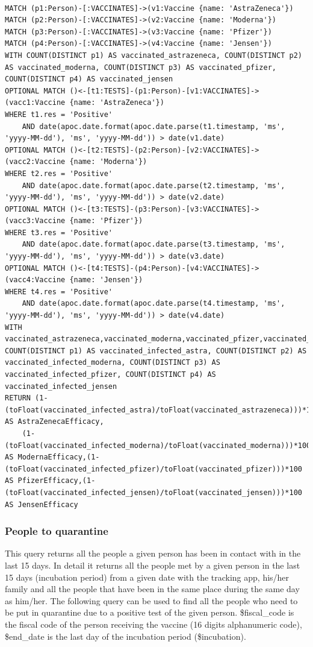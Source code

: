 \documentclass{article}
\begin{document}
\begin{lstlisting}[language=cypher, label=lst:cypher-example]

MATCH (p1:Person)-[:VACCINATES]->(v1:Vaccine {name: 'AstraZeneca'})
MATCH (p2:Person)-[:VACCINATES]->(v2:Vaccine {name: 'Moderna'})
MATCH (p3:Person)-[:VACCINATES]->(v3:Vaccine {name: 'Pfizer'})
MATCH (p4:Person)-[:VACCINATES]->(v4:Vaccine {name: 'Jensen'})
WITH COUNT(DISTINCT p1) AS vaccinated_astrazeneca, COUNT(DISTINCT p2) AS vaccinated_moderna, COUNT(DISTINCT p3) AS vaccinated_pfizer, COUNT(DISTINCT p4) AS vaccinated_jensen
OPTIONAL MATCH ()<-[t1:TESTS]-(p1:Person)-[v1:VACCINATES]->(vacc1:Vaccine {name: 'AstraZeneca'})
WHERE t1.res = 'Positive'
    AND date(apoc.date.format(apoc.date.parse(t1.timestamp, 'ms', 'yyyy-MM-dd'), 'ms', 'yyyy-MM-dd')) > date(v1.date)
OPTIONAL MATCH ()<-[t2:TESTS]-(p2:Person)-[v2:VACCINATES]->(vacc2:Vaccine {name: 'Moderna'})
WHERE t2.res = 'Positive'
    AND date(apoc.date.format(apoc.date.parse(t2.timestamp, 'ms', 'yyyy-MM-dd'), 'ms', 'yyyy-MM-dd')) > date(v2.date)
OPTIONAL MATCH ()<-[t3:TESTS]-(p3:Person)-[v3:VACCINATES]->(vacc3:Vaccine {name: 'Pfizer'})
WHERE t3.res = 'Positive'
    AND date(apoc.date.format(apoc.date.parse(t3.timestamp, 'ms', 'yyyy-MM-dd'), 'ms', 'yyyy-MM-dd')) > date(v3.date)
OPTIONAL MATCH ()<-[t4:TESTS]-(p4:Person)-[v4:VACCINATES]->(vacc4:Vaccine {name: 'Jensen'})
WHERE t4.res = 'Positive'
    AND date(apoc.date.format(apoc.date.parse(t4.timestamp, 'ms', 'yyyy-MM-dd'), 'ms', 'yyyy-MM-dd')) > date(v4.date)
WITH vaccinated_astrazeneca,vaccinated_moderna,vaccinated_pfizer,vaccinated_jensen, COUNT(DISTINCT p1) AS vaccinated_infected_astra, COUNT(DISTINCT p2) AS vaccinated_infected_moderna, COUNT(DISTINCT p3) AS vaccinated_infected_pfizer, COUNT(DISTINCT p4) AS vaccinated_infected_jensen
RETURN (1- (toFloat(vaccinated_infected_astra)/toFloat(vaccinated_astrazeneca)))*100 AS AstraZenecaEfficacy,
    (1- (toFloat(vaccinated_infected_moderna)/toFloat(vaccinated_moderna)))*100 AS ModernaEfficacy,(1- (toFloat(vaccinated_infected_pfizer)/toFloat(vaccinated_pfizer)))*100 AS PfizerEfficacy,(1- (toFloat(vaccinated_infected_jensen)/toFloat(vaccinated_jensen)))*100 AS JensenEfficacy
\end{lstlisting}
\newpage
\subsubsection{People to quarantine}
This query returns all the people a given person has been in contact with in the last 15 days. In detail it returns all the people met by a given person in the last 15 days (incubation period) from a given date with the tracking app, his/her family and all the people that have been in the same place during the same day as him/her.
The following query can be used to find all the people who need to be put in quarantine due to a positive test of the given person.
\$fiscal\_code is the fiscal code of the person receiving the vaccine (16 digits alphanumeric code), \$end\_date is the last day of the incubation period (\$incubation).
\end{document}
